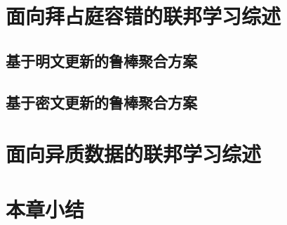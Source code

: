 \section{面向拜占庭容错的联邦学习综述}
\label{sec:byzantine}
\subsection{基于明文更新的鲁棒聚合方案}

\subsection{基于密文更新的鲁棒聚合方案}

\section{面向异质数据的联邦学习综述}
\label{sec:noniid}


\section{本章小结}

